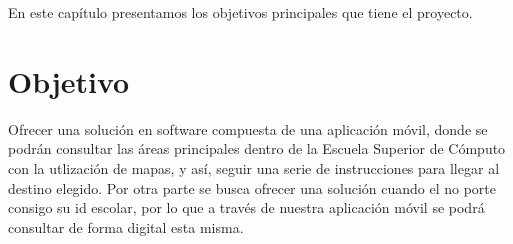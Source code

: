 
\label{ch:Alcance}

En este capítulo presentamos los objetivos principales que tiene el proyecto.

\section{Objetivo}

Ofrecer una solución en software compuesta de una aplicación móvil, donde se podrán consultar las áreas principales dentro de la Escuela Superior de Cómputo con la utlización de mapas, y así, seguir una serie de instrucciones para llegar al destino elegido. Por otra parte se busca ofrecer una solución cuando el  no porte consigo su id escolar, por lo que a través de nuestra aplicación móvil se podrá consultar de forma digital esta misma.

